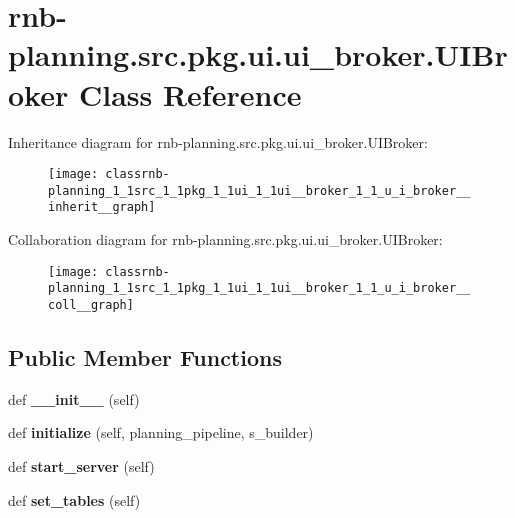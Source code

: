 \hypertarget{classrnb-planning_1_1src_1_1pkg_1_1ui_1_1ui__broker_1_1_u_i_broker}{}\section{rnb-\/planning.src.\+pkg.\+ui.\+ui\+\_\+broker.\+U\+I\+Broker Class Reference}
\label{classrnb-planning_1_1src_1_1pkg_1_1ui_1_1ui__broker_1_1_u_i_broker}


Inheritance diagram for rnb-\/planning.src.\+pkg.\+ui.\+ui\+\_\+broker.\+U\+I\+Broker\+:\nopagebreak
\begin{figure}[H]
\begin{center}
\leavevmode
\texttt{[image: classrnb-planning\_1\_1src\_1\_1pkg\_1\_1ui\_1\_1ui\_\_broker\_1\_1\_u\_i\_broker\_\_inherit\_\_graph]}
\end{center}
\end{figure}


Collaboration diagram for rnb-\/planning.src.\+pkg.\+ui.\+ui\+\_\+broker.\+U\+I\+Broker\+:\nopagebreak
\begin{figure}[H]
\begin{center}
\leavevmode
\texttt{[image: classrnb-planning\_1\_1src\_1\_1pkg\_1\_1ui\_1\_1ui\_\_broker\_1\_1\_u\_i\_broker\_\_coll\_\_graph]}
\end{center}
\end{figure}
\subsection*{Public Member Functions}
\begin{DoxyCompactItemize}
\item 
\mbox{\label{classrnb-planning_1_1src_1_1pkg_1_1ui_1_1ui__broker_1_1_u_i_broker_aeaa4c1df3279c9635ab3c7b09cb675a3}} 
def {\bfseries \+\_\+\+\_\+init\+\_\+\+\_\+} (self)
\item 
\mbox{\label{classrnb-planning_1_1src_1_1pkg_1_1ui_1_1ui__broker_1_1_u_i_broker_a16de86c6597bb846e3c6301d8130dc83}} 
def {\bfseries initialize} (self, planning\+\_\+pipeline, s\+\_\+builder)
\item 
\mbox{\label{classrnb-planning_1_1src_1_1pkg_1_1ui_1_1ui__broker_1_1_u_i_broker_ac8698ddb4f4f02de69873f5d5e42b3e9}} 
def {\bfseries start\+\_\+server} (self)
\item 
\mbox{\label{classrnb-planning_1_1src_1_1pkg_1_1ui_1_1ui__broker_1_1_u_i_broker_a8f6441b3ebd8aa6fd0fefb369fd884f4}} 
def {\bfseries set\+\_\+tables} (self)
\end{DoxyCompactItemize}
